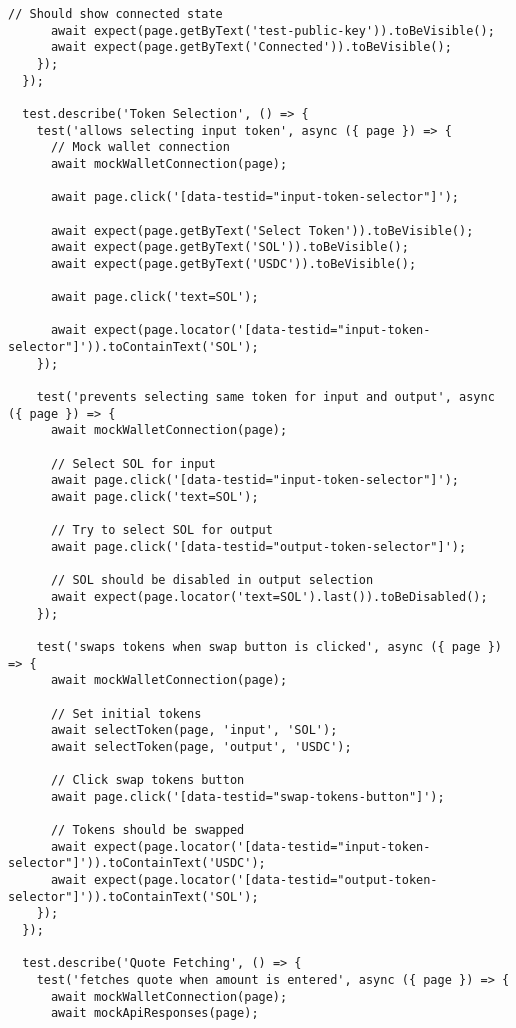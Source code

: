 \documentclass[11pt,a4paper]{article}
\begin{document}
\begin{lstlisting}[style=typescript, caption=E2E Test Implementation]
      // Should show connected state
      await expect(page.getByText('test-public-key')).toBeVisible();
      await expect(page.getByText('Connected')).toBeVisible();
    });
  });

  test.describe('Token Selection', () => {
    test('allows selecting input token', async ({ page }) => {
      // Mock wallet connection
      await mockWalletConnection(page);

      await page.click('[data-testid="input-token-selector"]');
      
      await expect(page.getByText('Select Token')).toBeVisible();
      await expect(page.getByText('SOL')).toBeVisible();
      await expect(page.getByText('USDC')).toBeVisible();

      await page.click('text=SOL');
      
      await expect(page.locator('[data-testid="input-token-selector"]')).toContainText('SOL');
    });

    test('prevents selecting same token for input and output', async ({ page }) => {
      await mockWalletConnection(page);

      // Select SOL for input
      await page.click('[data-testid="input-token-selector"]');
      await page.click('text=SOL');

      // Try to select SOL for output
      await page.click('[data-testid="output-token-selector"]');
      
      // SOL should be disabled in output selection
      await expect(page.locator('text=SOL').last()).toBeDisabled();
    });

    test('swaps tokens when swap button is clicked', async ({ page }) => {
      await mockWalletConnection(page);

      // Set initial tokens
      await selectToken(page, 'input', 'SOL');
      await selectToken(page, 'output', 'USDC');

      // Click swap tokens button
      await page.click('[data-testid="swap-tokens-button"]');

      // Tokens should be swapped
      await expect(page.locator('[data-testid="input-token-selector"]')).toContainText('USDC');
      await expect(page.locator('[data-testid="output-token-selector"]')).toContainText('SOL');
    });
  });

  test.describe('Quote Fetching', () => {
    test('fetches quote when amount is entered', async ({ page }) => {
      await mockWalletConnection(page);
      await mockApiResponses(page);


\end{lstlisting}
\end{document}
